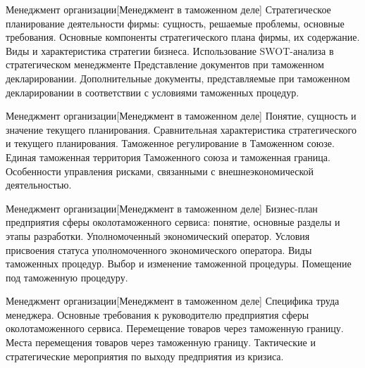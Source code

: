 \documentclass[
	11pt,
	a4paper,
	]
	{article}
\begin{document}
\vfill



\begin{minipage}[t][\miniH]{\miniL}\centering
	 {Менеджмент организации}[Менеджмент в таможенном деле]
		{
			Стратегическое планирование деятельности фирмы: сущность, решаемые проблемы, основные требования. Основные компоненты стратегического плана фирмы, их содержание.
		}{
			Виды и характеристика стратегии бизнеса. Использование SWOT-анализа в стратегическом менеджменте
		}{
			Представление документов при таможенном декларировании. Дополнительные документы, представляемые при таможенном декларировании в соответствии с условиями таможенных процедур.
		}
	\lowGE
\end{minipage}

\vfill



\begin{minipage}[t][\miniH]{\miniL}\centering
	 {Менеджмент организации}[Менеджмент в таможенном деле]
		{
			Понятие, сущность и значение текущего планирования. Сравнительная характеристика стратегического и текущего планирования.
		}{
			Таможенное регулирование в Таможенном союзе. Единая таможенная территория Таможенного союза и таможенная граница.
		}{
			Особенности управления рисками, связанными с внешнеэкономической деятельностью.
		}
	\lowGE
\end{minipage}





\begin{minipage}[t][\miniH]{\miniL}\centering
	 {Менеджмент организации}[Менеджмент в таможенном деле]
		{
			Бизнес-план предприятия сферы околотаможенного сервиса: понятие, основные разделы и этапы разработки.
		}{
			Уполномоченный экономический оператор. Условия присвоения статуса уполномоченного экономического оператора.
		}{
			Виды таможенных процедур. Выбор и изменение таможенной процедуры. Помещение под таможенную процедуру.
		}
	\lowGE
\end{minipage}

\vfill



\begin{minipage}[t][\miniH]{\miniL}\centering
	 {Менеджмент организации}[Менеджмент в таможенном деле]
		{
			Специфика труда менеджера. Основные требования к руководителю предприятия сферы околотаможенного сервиса.
		}{
			Перемещение товаров через таможенную границу. Места перемещения товаров через таможенную границу.
		}{
			Тактические и стратегические мероприятия по выходу предприятия из кризиса.
		}
	\lowGE
\end{minipage}
\end{document}
